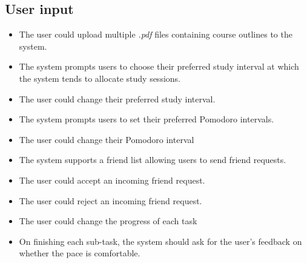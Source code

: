 \documentclass[12pt]{article}
\newcounter{reqnum} %
\newcommand{\rthereqnum}{FR\refstepcounter{reqnum}\thereqnum:}
\begin{document}
\subsection{User input}
\begin{itemize}
\item[\rthereqnum \label{R_GetConsent}]
The user could upload multiple \textit{.pdf} files containing course outlines to the system.
\item[\rthereqnum \label{R_GetConsent}]
The system prompts users to choose their preferred study interval at which the system tends to allocate study sessions.
\item[\rthereqnum \label{R_GetConsent}]
The user could change their preferred study interval.
\item[\rthereqnum \label{R_GetConsent}]
The system prompts users to set their preferred Pomodoro intervals. 
\item[\rthereqnum \label{R_GetConsent}]
The user could change their Pomodoro interval
\item[\rthereqnum \label{R_GetConsent}]
The system supports a friend list allowing users to send friend requests.
\item[\rthereqnum \label{R_GetConsent}]
The user could accept an incoming friend request.
\item[\rthereqnum \label{R_GetConsent}]
The user could reject an incoming friend request.
\item[\rthereqnum \label{R_GetConsent}]
The user could change the progress of each task
\item[\rthereqnum \label{R_GetConsent}]
On finishing each sub-task, the system should ask for the user's feedback on whether the pace is comfortable.
\end{itemize}
\end{document}

